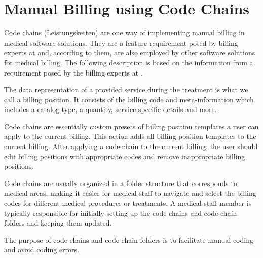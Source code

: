 \section{Manual Billing using Code Chains}\label{sec:billing-positions-and-code-chains}

Code chains (Leistungsketten) are one way of implementing manual billing in medical software solutions.
They are a feature requirement posed by billing experts at \AV and, according to them, are also employed by other software solutions for medical billing.
The following description is based on the information from a requirement posed by the billing experts at \AV.

The data representation of a provided service during the treatment is what we call a billing position.
It consists of the billing code and meta-information which includes a catalog type, a quantity, service-specific details and more.

Code chains are essentially custom presets of billing position templates a user can apply to the current billing.
This action adds all billing position templates to the current billing.
After applying a code chain to the current billing, the user should edit billing positions with appropriate codes and remove inappropriate billing positions.

Code chains are usually organized in a folder structure that corresponds to medical areas,
making it easier for medical staff to navigate and select the billing codes for different medical procedures or treatments.
A medical staff member is typically responsible for initially setting up the code chains and code chain folders and keeping them updated.

The purpose of code chains and code chain folders is to facilitate manual coding and avoid coding errors.


